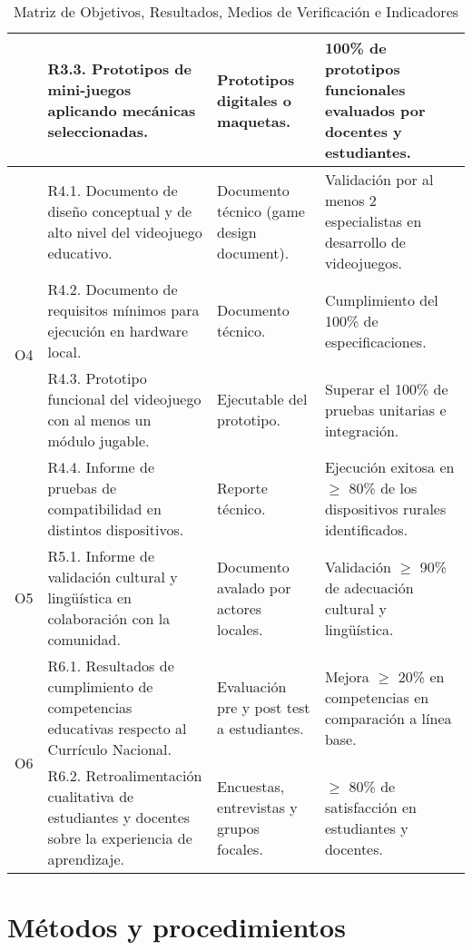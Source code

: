 \begin{table}[h]
\begin{tabularx}{\textwidth}{|c|X|X|X|}
& R3.3. Prototipos de mini-juegos aplicando mecánicas seleccionadas. 
& Prototipos digitales o maquetas. 
& 100\% de prototipos funcionales evaluados por docentes y estudiantes. \\ 
\hline

\multirow{4}{*}{O4} 
& R4.1. Documento de diseño conceptual y de alto nivel del videojuego educativo. 
& Documento técnico (game design document). 
& Validación por al menos 2 especialistas en desarrollo de videojuegos. \\ \cline{2-4}

& R4.2. Documento de requisitos mínimos para ejecución en hardware local. 
& Documento técnico. 
& Cumplimiento del 100\% de especificaciones. \\ \cline{2-4}

& R4.3. Prototipo funcional del videojuego con al menos un módulo jugable. 
& Ejecutable del prototipo. 
& Superar el 100\% de pruebas unitarias e integración. \\ \cline{2-4}

& R4.4. Informe de pruebas de compatibilidad en distintos dispositivos. 
& Reporte técnico. 
& Ejecución exitosa en $\geq$ 80\% de los dispositivos rurales identificados. \\ 
\hline

\multirow{1}{*}{O5} 
& R5.1. Informe de validación cultural y lingüística en colaboración con la comunidad. 
& Documento avalado por actores locales. 
& Validación $\geq$ 90\% de adecuación cultural y lingüística. \\ 
\hline

\multirow{2}{*}{O6} 
& R6.1. Resultados de cumplimiento de competencias educativas respecto al Currículo Nacional. 
& Evaluación pre y post test a estudiantes. 
& Mejora $\geq$ 20\% en competencias en comparación a línea base. \\ \cline{2-4}

& R6.2. Retroalimentación cualitativa de estudiantes y docentes sobre la experiencia de aprendizaje. 
& Encuestas, entrevistas y grupos focales. 
& $\geq$ 80\% de satisfacción en estudiantes y docentes. \\ 
\hline

\end{tabularx}
\caption{Matriz de Objetivos, Resultados, Medios de Verificación e Indicadores}
\end{table}

\section{Métodos y procedimientos}